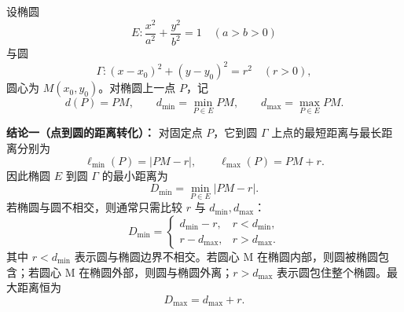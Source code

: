 设椭圆
\[
	E:\frac{x^2}{a^2}+\frac{y^2}{b^2}=1\quad (a>b>0)
\]
与圆
\[
	\Gamma:(x-x_0)^2+(y-y_0)^2=r^2\quad (r>0),
\]
圆心为 $M(x_0,y_0)$。对椭圆上一点 $P$，记
\[
	d(P)=PM,
	\qquad
	d_{\min}=\min_{P\in E} PM,
	\qquad
	d_{\max}=\max_{P\in E} PM.
\]

\textbf{结论一（点到圆的距离转化）：}
对固定点 $P$，它到圆 $\Gamma$ 上点的最短距离与最长距离分别为
\[
	\ell_{\min}(P)=|PM-r|,
	\qquad
	\ell_{\max}(P)=PM+r.
\]
因此椭圆 $E$ 到圆 $\Gamma$ 的最小距离为
\[
	D_{\min}=\min_{P\in E}|PM-r|.
\]
若椭圆与圆不相交，则通常只需比较 $r$ 与 $d_{\min},d_{\max}$：
\[
	D_{\min}=
	\begin{cases}
		d_{\min}-r, & r<d_{\min}, \\[2mm]
		r-d_{\max}, & r>d_{\max}.
	\end{cases}
\]
其中 $r<d_{\min}$ 表示圆与椭圆边界不相交。若圆心 M 在椭圆内部，则圆被椭圆包含；若圆心 M 在椭圆外部，则圆与椭圆外离；$r>d_{\max}$ 表示圆包住整个椭圆。最大距离恒为
\[
	D_{\max}=d_{\max}+r.
\]